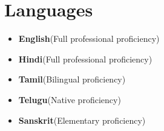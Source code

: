 \section{Languages}
 \begin{itemize}
       \item \textbf{English}(Full professional proficiency)\\
       \item \textbf{Hindi}(Full professional proficiency)\\
       \item \textbf{Tamil}(Bilingual proficiency)\\
       \item \textbf{Telugu}(Native proficiency)\\
       \item \textbf{Sanskrit}(Elementary proficiency)\\
\end{itemize} 
